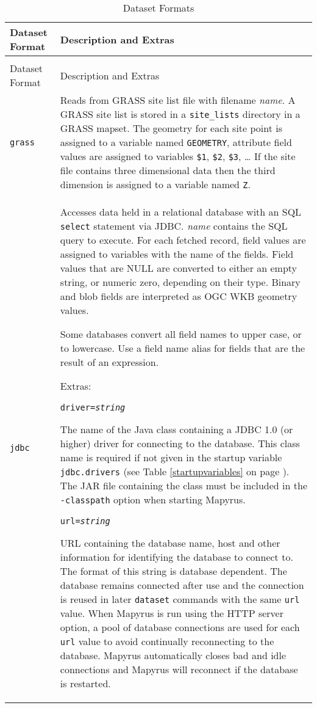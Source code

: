 \begin{longtable}{|p{3cm}|p{10cm}|}
\hline
\label{datasettypes}
Dataset Format & Description and Extras \\
\hline
\hline
\endfirsthead
\hline
\caption{Dataset Formats} \\
\endfoot

\hline
Dataset Format & Description and Extras \\
\hline
\hline
\endhead

\texttt{grass} &
Reads from GRASS site list file with filename \textit{name}.
A GRASS site list is stored in a \texttt{site\_lists}
directory in a GRASS mapset.
The geometry for each site point is assigned to a variable named
\texttt{GEOMETRY}, attribute field values are assigned to variables
\texttt{\$1}, \texttt{\$2}, \texttt{\$3}, \dots
If the site file contains three dimensional data then the
third dimension is assigned to a variable named \texttt{Z}.  \\

\hline

\texttt{jdbc} &
Accesses data held in a relational database with
an SQL \texttt{select} statement via JDBC.
\textit{name} contains the SQL query to execute.
For each fetched record, field values are assigned to variables
with the name of the fields.
Field values that are NULL are converted to either an empty string,
or numeric zero, depending on their type.
Binary and blob fields are interpreted as OGC WKB geometry values.

Some databases convert all field names to upper case, or to lowercase.
Use a field name alias for fields that are the result of an expression.

\vspace{10pt}
Extras:

\texttt{driver=\textit{string}}

The name of the Java class containing a JDBC 1.0 (or higher)
driver for connecting to the database.
This class name is required if not given in the startup variable
\texttt{jdbc.drivers} (see Table \ref{startupvariables}
on page \pageref{startupvariables}).
The JAR file containing the class must be included in the \texttt{-classpath}
option when starting Mapyrus.

\vspace{10pt}
\texttt{url=\textit{string}}

URL containing the database name, host and other information for identifying
the database to connect to.
The format of this string is database dependent.
The database remains connected after use and the connection is reused in later
\texttt{dataset} commands with the same \texttt{url} value.
When Mapyrus is run using the HTTP server option, a pool of
database connections are used for each \texttt{url} value to avoid
continually reconnecting to the database.
Mapyrus automatically closes bad and idle connections
and Mapyrus will reconnect if the database is restarted.


\end{longtable}
